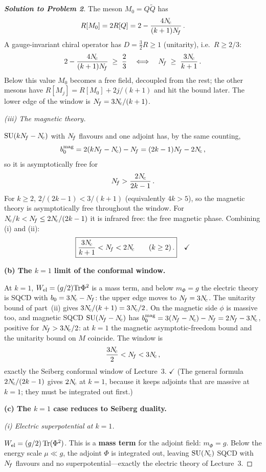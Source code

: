 \documentclass[11pt,a4paper]{article}
\begin{document}
\begin{proof}[\textbf{Solution to Problem 2}]
The meson $M_0 = Q\widetilde{Q}$ has
\[
  R[M_0] = 2R[Q] = 2 - \frac{4N_{\!c}}{(k+1)N_{\!f}}\,.
\]
A gauge-invariant chiral operator has $D = \tfrac{3}{2}R \geq 1$
(unitarity), i.e.\ $R \geq 2/3$:
\[
  2 - \frac{4N_{\!c}}{(k+1)N_{\!f}} \;\geq\; \frac{2}{3}
  \quad\Longleftrightarrow\quad
  N_{\!f} \;\geq\; \frac{3N_{\!c}}{k+1}\,.
\]
Below this value $M_0$ becomes a free field, decoupled from the rest;
the other mesons have $R[M_j] = R[M_0] + 2j/(k+1)$ and hit the bound
later.  The lower edge of the window is $N_{\!f} = 3N_{\!c}/(k+1)$.

\textit{(iii) The magnetic theory.}

$\mathrm{SU}(kN_{\!f} - N_{\!c})$ with $N_{\!f}$ flavours and one adjoint has, by the same
counting,
\[
  b_0^{\text{mag}} = 2(kN_{\!f} - N_{\!c}) - N_{\!f} = (2k-1)N_{\!f} - 2N_{\!c}\,,
\]
so it is asymptotically free for
\[
  N_{\!f} > \frac{2N_{\!c}}{2k-1}\,.
\]
For $k \geq 2$, $2/(2k-1) < 3/(k+1)$ (equivalently $4k > 5$), so the
magnetic theory is asymptotically free throughout the window.  For
$N_{\!c}/k < N_{\!f} \leq 2N_{\!c}/(2k-1)$ it is infrared free: the free magnetic
phase.  Combining (i) and (ii):
\[
  \boxed{\frac{3N_{\!c}}{k+1} < N_{\!f} < 2N_{\!c}\qquad (k \geq 2)\,.}
  \quad\checkmark
\]

\bigskip

\textbf{(b) The $k = 1$ limit of the conformal window.}

At $k = 1$, $W_{\text{el}} = (g/2)\mathrm{Tr}\Phi^2$ is a mass term, and below
$m_\Phi = g$ the electric theory is SQCD with $b_0 = 3N_{\!c} - N_{\!f}$: the
upper edge moves to $N_{\!f} = 3N_{\!c}$.  The unitarity bound of part~(ii)
gives $3N_{\!c}/(k+1) = 3N_{\!c}/2$.  On the magnetic side $\phi$ is massive
too, and magnetic SQCD $\mathrm{SU}(N_{\!f} - N_{\!c})$ has
$b_0^{\text{mag}} = 3(N_{\!f} - N_{\!c}) - N_{\!f} = 2N_{\!f} - 3N_{\!c}$, positive for
$N_{\!f} > 3N_{\!c}/2$: at $k = 1$ the magnetic asymptotic-freedom bound and the
unitarity bound on $M$ coincide.  The window is
\[
  \frac{3N_{\!c}}{2} < N_{\!f} < 3N_{\!c}\,,
\]
exactly the Seiberg conformal window of Lecture~3.
\quad$\checkmark$
(The general formula $2N_{\!c}/(2k-1)$ gives $2N_{\!c}$ at $k = 1$, because it
keeps adjoints that are massive at $k = 1$; they must be integrated out
first.)

\bigskip

\textbf{(c) The $k = 1$ case reduces to Seiberg duality.}

\textit{(i) Electric superpotential at $k = 1$.}

$W_{\text{el}} = (g/2)\,\mathrm{Tr}(\Phi^2)$.  This is a \textbf{mass term}
for the adjoint field: $m_\Phi = g$.  Below the energy scale
$\mu \ll g$, the adjoint $\Phi$ is integrated out, leaving $\mathrm{SU}(N_{\!c})$
SQCD with $N_{\!f}$ flavours and no superpotential---exactly the electric
theory of Lecture~3.


\end{proof}
\end{document}
